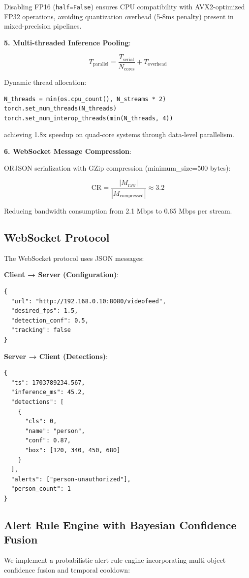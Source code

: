 \documentclass[conference]{IEEEtran}
\begin{document}
Disabling FP16 (\texttt{half=False}) ensures CPU compatibility with AVX2-optimized FP32 operations, avoiding quantization overhead (5-8ms penalty) present in mixed-precision pipelines.

\textbf{5. Multi-threaded Inference Pooling}:

\begin{equation}
T_{\text{parallel}} = \frac{T_{\text{serial}}}{N_{\text{cores}}} + T_{\text{overhead}}
\end{equation}

Dynamic thread allocation:

\begin{verbatim}
N_threads = min(os.cpu_count(), N_streams * 2)
torch.set_num_threads(N_threads)
torch.set_num_interop_threads(min(N_threads, 4))
\end{verbatim}

achieving 1.8x speedup on quad-core systems through data-level parallelism.

\textbf{6. WebSocket Message Compression}:

ORJSON serialization with GZip compression (minimum\_size=500 bytes):

\begin{equation}
\text{CR} = \frac{|M_{\text{raw}}|}{|M_{\text{compressed}}|} \approx 3.2
\end{equation}

Reducing bandwidth consumption from 2.1 Mbps to 0.65 Mbps per stream.

\subsection{WebSocket Protocol}
The WebSocket protocol uses JSON messages:

\textbf{Client → Server (Configuration)}:
\begin{verbatim}
{
  "url": "http://192.168.0.10:8080/videofeed",
  "desired_fps": 1.5,
  "detection_conf": 0.5,
  "tracking": false
}
\end{verbatim}

\textbf{Server → Client (Detections)}:
\begin{verbatim}
{
  "ts": 1703789234.567,
  "inference_ms": 45.2,
  "detections": [
    {
      "cls": 0,
      "name": "person",
      "conf": 0.87,
      "box": [120, 340, 450, 680]
    }
  ],
  "alerts": ["person-unauthorized"],
  "person_count": 1
}
\end{verbatim}

\subsection{Alert Rule Engine with Bayesian Confidence Fusion}
We implement a probabilistic alert rule engine incorporating multi-object confidence fusion and temporal cooldown:
\end{document}
